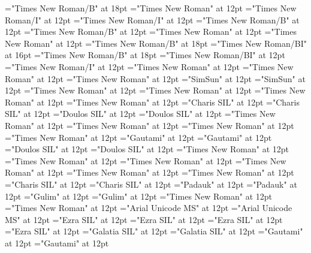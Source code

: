 \documentclass[a4paper]{article}
\begin{document}
\font\ChapterNumberParagraphscrSectioncolumnsscrBookscrBody="Times New Roman/B" at 18pt
\font\ParagraphscrSectioncolumnsscrBookscrBody="Times New Roman" at 12pt
\font\spanParallelPassageReferencescrSectioncolumnsscrBookscrBody="Times New Roman/I" at 12pt
\font\ParallelPassageReferencescrSectioncolumnsscrBookscrBody="Times New Roman/I" at 12pt
\font\spanSectionHeadscrSectioncolumnsscrBookscrBody="Times New Roman/B" at 12pt
\font\SectionHeadscrSectioncolumnsscrBookscrBody="Times New Roman/B" at 12pt
\font\scrSectioncolumnsscrBookscrBody="Times New Roman" at 12pt
\font\columnsscrBookscrBody="Times New Roman" at 12pt
\font\spanTitleMainscrBookscrBody="Times New Roman/B" at 18pt
\font\TitleSecondaryTitleMainscrBookscrBody="Times New Roman/BI" at 16pt
\font\TitleMainscrBookscrBody="Times New Roman/B" at 18pt
\font\scrBookCodescrBookscrBody="Times New Roman/BI" at 12pt
\font\scrBookNamescrBookscrBody="Times New Roman/I" at 12pt
\font\scrBookscrBody="Times New Roman" at 12pt
\font\imgpicturedivpictureLeft="Times New Roman" at 12pt
\font\picturepictureRight="Times New Roman" at 12pt
\font\spanzhCN="SimSun" at 12pt
\font\divzhCN="SimSun" at 12pt
\font\spanur="Times New Roman" at 12pt
\font\divur="Times New Roman" at 12pt
\font\spanurxind="Times New Roman" at 12pt
\font\divurxind="Times New Roman" at 12pt
\font\spantr="Charis SIL" at 12pt
\font\divtr="Charis SIL" at 12pt
\font\spantrfonipa="Doulos SIL" at 12pt
\font\divtrfonipa="Doulos SIL" at 12pt
\font\spantrfonipaxemic="Times New Roman" at 12pt
\font\divtrfonipaxemic="Times New Roman" at 12pt
\font\spantpi="Times New Roman" at 12pt
\font\divtpi="Times New Roman" at 12pt
\font\spante="Gautami" at 12pt
\font\divte="Gautami" at 12pt
\font\spanseh="Doulos SIL" at 12pt
\font\divseh="Doulos SIL" at 12pt
\font\spanru="Times New Roman" at 12pt
\font\divru="Times New Roman" at 12pt
\font\spanqaaxcam="Times New Roman" at 12pt
\font\divqaaxcam="Times New Roman" at 12pt
\font\spanpt="Times New Roman" at 12pt
\font\divpt="Times New Roman" at 12pt
\font\spannko="Charis SIL" at 12pt
\font\divnko="Charis SIL" at 12pt
\font\spanmy="Padauk" at 12pt
\font\divmy="Padauk" at 12pt
\font\spanko="Gulim" at 12pt
\font\divko="Gulim" at 12pt
\font\spanid="Times New Roman" at 12pt
\font\divid="Times New Roman" at 12pt
\font\spanhi="Arial Unicode MS" at 12pt
\font\divhi="Arial Unicode MS" at 12pt
\font\spanhe="Ezra SIL" at 12pt
\font\divhe="Ezra SIL" at 12pt
\font\spanhbo="Ezra SIL" at 12pt
\font\divhbo="Ezra SIL" at 12pt
\font\spangrc="Galatia SIL" at 12pt
\font\divgrc="Galatia SIL" at 12pt
\font\spanggoTeluIN="Gautami" at 12pt
\font\divggoTeluIN="Gautami" at 12pt
\end{document}

